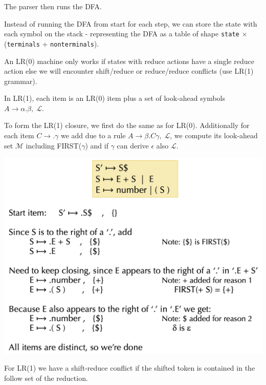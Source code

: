 The parser then runs the DFA.\medskip

Instead of running the DFA from start for each step, we can store the state with each symbol on the stack - representing the DFA as a table of shape \texttt{state} $\times$ (\texttt{terminals} + \texttt{nonterminals}). \medskip

An LR(0) machine only works if states with reduce actions have a single reduce action else we will encounter shift/reduce or reduce/reduce conflicts (use LR(1) grammar). \medskip

In LR(1), each item is an LR(0) item plus a set of look-ahead symbols $A \to \alpha . \beta, \; \mathcal L$.\medskip

To form the LR(1) closure, we first do the same as for LR(0). Additionally for each item $C \to . \gamma$ we add due to a rule $A \to \beta . C \gamma, \; \mathcal L$, we compute its look-ahead set $\mathcal M$ including FIRST($\gamma$) and if $\gamma$ can derive $\epsilon$ also $\mathcal L$. \medskip

\begin{center}
	\includegraphics[width=\linewidth]{assets/lr1.png}
\end{center}
		
For LR(1) we have a shift-reduce conflict if the shifted token is contained in the follow set of the reduction.



